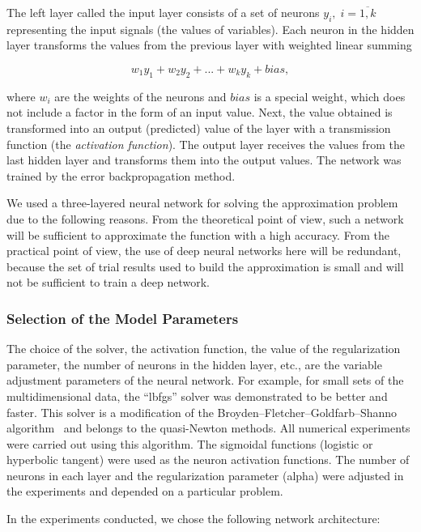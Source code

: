 \documentclass[mathematics,article,accept,pdftex,moreauthors]{Definitions/mdpi}
\begin{document}
The left layer called the input layer consists of a set of neurons $y_i, \; i=\overline{1,k}$ representing the input signals (the values of variables). Each neuron in the hidden layer transforms the values from the previous layer with weighted linear summing 
\begin{linenomath}
\begin{equation}
w_1 y_1 + w_2 y_2+...+w_k y_k+bias,
\end{equation}
\end{linenomath}
where $w_i$ are the weights of the neurons and $bias$ is a special weight, which does not include a factor in the form of an input value. Next, the value obtained is transformed into an output (predicted) value of the layer with a transmission function (the \textit{activation function}). The output layer receives the values from the last hidden layer and transforms them into the output values. The network was trained by the error backpropagation method.

We used a three-layered neural network for solving the approximation problem due to the following reasons. From the theoretical point of view, such a network will be sufficient to approximate the function with a high accuracy. From the practical point of view, the use of deep neural networks here will be redundant, because the set of trial results used to build the approximation is small and will not be sufficient to train a deep network.

\subsubsection{Selection of the Model Parameters}

The choice of the solver, the activation function, the value of the regularization parameter, the number of neurons in the hidden layer, etc., are the variable adjustment parameters of the neural network.
For example, for small sets of the multidimensional data, the ``lbfgs'' solver was demonstrated to be better and faster. This solver is a modification of the Broyden--Fletcher--Goldfarb--Shanno algorithm~\cite{Nocedal2006} and belongs to the quasi-Newton methods. All numerical experiments were carried out using this algorithm.
The sigmoidal functions (logistic or hyperbolic tangent) were used as the neuron activation functions.
The number of neurons in each layer and the regularization parameter (alpha) were adjusted in the experiments and depended on a particular problem.

In the experiments conducted, we chose the following network architecture:
\end{document}
